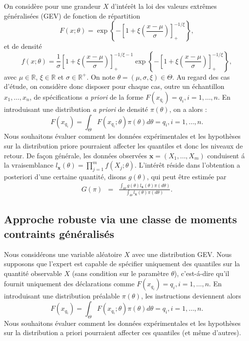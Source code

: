 \documentclass[10pt]{article}
\newcommand{\ds}{\displaystyle}
\newcommand{\1}{\mathbbm{1}}
\begin{document}
On consid\`ere pour une grandeur $X$ d'int\'er\^et la loi des valeurs extr\^emes g\'en\'eralis\'ees (GEV) de fonction de r\'epartition 
\[
F(x; \theta)=\exp\left\{-\left[1+\xi \left(
\frac{x-\mu}{\sigma} \right)\right]_{+}^{-1/\xi} \right\},
\]
et de densit\'e
\[
f(x; \theta)=\frac{1}{\sigma}\left[1 + \xi \left(
\frac{x-\mu}{\sigma}\right)\right]_{+}^{-1/\xi-1}
\exp \left\{-\left[1+\xi \left(\frac{x-\mu}{\sigma} \right)\right]_{+}^{-1/\xi} \right\},
\]
avec $\mu \in \mathbb{R}$, $\xi \in \mathbb{R}$ et $\sigma \in \mathbb{R}^{+}$. On note $\theta = (\mu, \sigma, \xi) \in \Theta$. Au regard des cas d'\'etude, on consid\`ere donc disposer pour chaque cas, outre un \'echantillon $x_1,\ldots,x_n$, de sp\'ecifications {\it a priori} de la forme $F(x_{q_i})=q_i, i=1, \dots, n$. En introduisant une distribution {\it a priori} de densit\'e $\pi(\theta)$, on a alors :
\[
F(x_{q_i}) = \int_{\Theta} F(x_{q_i}; \theta) \pi(\theta) d\theta = q_i, i=1, \dots, n.
\]
Nous souhaitons \'evaluer comment les donn\'ees exp\'erimentales et les hypoth\`eses sur la distribution priore pourraient affecter les quantiles et donc les niveaux de retour. De fa\c con g\'en\'erale, les donn\'ees observ\'ees $\mathbf{x}=(X_1, \ldots, X_m)$ conduisent \'a la vraisemblance $l_\mathbf{x}(\theta)= \ds \prod_{j=1}^m f(X_j ; \theta)$. L'int\'er\^et r\'eside dans l'obtention a posteriori d'une certaine quantit\'e, disons $g(\theta)$, qui peut \^etre estim\'ee par 
\begin{eqnarray}
G(\pi) & = & \frac{\int_{\Theta}g(\theta) l_\mathbf{x}(\theta) \pi(d\theta)}{\int_{\Theta} l_\mathbf{x}(\theta)\pi(d\theta)}. \label{g.pi}
\end{eqnarray}


\subsection{Approche robuste via une classe de moments contraints g\'en\'eralis\'es }

Nous consid\'erons une variable al\'eatoire $X$ avec une distribution GEV. Nous supposons que l'expert est capable de sp\'ecifier uniquement des quantiles sur la quantit\'e observable $X$ (sans condition sur le param\`etre $\theta$), c'est-\'a-dire qu'il fournit uniquement des d\'eclarations comme $F(x_{q_i})=q_i, i=1, \dots, n$. En introduisant une distribution pr\'ealable $\pi(\theta)$, les instructions deviennent alors
\[
F(x_{q_i}) = \int_{\Theta} F(x_{q_i} ; \theta) \pi(\theta) d\theta = q_i, i=1, \dots, n.
\]
Nous souhaitons \'evaluer comment les donn\'ees exp\'erimentales et les hypoth\`eses sur la distribution a priori pourraient affecter ces quantiles (et m\^eme d'autres). \\
\end{document}

